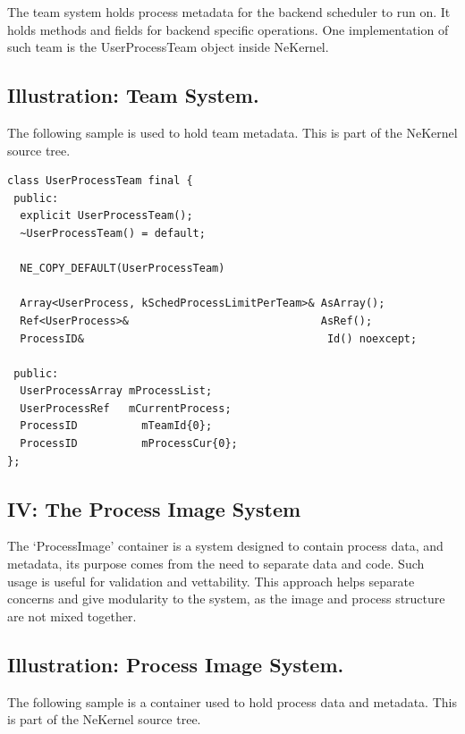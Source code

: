 \documentclass[11pt, a4paper]{article}
\begin{document}
{The team system holds process metadata for the backend scheduler to run on. It holds methods and fields for backend specific operations.} {One implementation of such team is the UserProcessTeam object inside NeKernel.}

\subsection{Illustration: Team System.}

{The following sample is used to hold team metadata.} {This is part of the NeKernel source tree.}

\begin{lstlisting}
class UserProcessTeam final {
 public:
  explicit UserProcessTeam();
  ~UserProcessTeam() = default;

  NE_COPY_DEFAULT(UserProcessTeam)

  Array<UserProcess, kSchedProcessLimitPerTeam>& AsArray();
  Ref<UserProcess>&                              AsRef();
  ProcessID&                                      Id() noexcept;

 public:
  UserProcessArray mProcessList;
  UserProcessRef   mCurrentProcess;
  ProcessID          mTeamId{0};
  ProcessID          mProcessCur{0};
};
\end{lstlisting}

\subsection{IV: The Process Image System}

{The `ProcessImage' container is a system designed to contain process data, and metadata, its purpose comes from the need to separate data and code. Such usage is useful for validation and vettability.} {This approach helps separate concerns and give modularity to the system, as the image and process structure are not mixed together.}

\subsection{Illustration: Process Image System.}

{The following sample is a container used to hold process data and metadata.} {This is part of the NeKernel source tree.}
\end{document}
